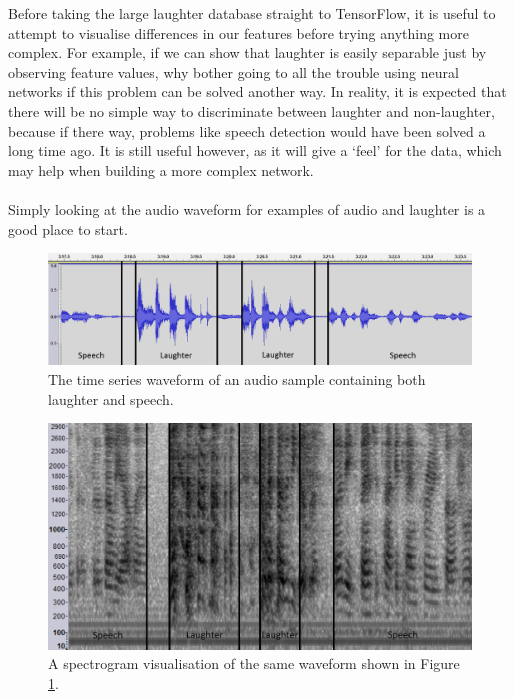 \documentclass[a4paper,11pt,notitlepage]{article}
\begin{document}
Before taking the large laughter database straight to TensorFlow, it is useful to attempt to visualise differences in our features before trying anything more complex. For example, if we can show that laughter is easily separable just by observing feature values, why bother going to all the trouble using neural networks if this problem can be solved another way. In reality, it is expected that there will be no simple way to discriminate between laughter and non-laughter, because if there way, problems like speech detection would have been solved a long time ago. It is still useful however, as it will give a `feel' for the data, which may help when building a more complex network.\\
\\
Simply looking at the audio waveform for examples of audio and laughter is a good place to start.

\begin{figure}[H]
	\centering
	\vspace{0.5cm}
	\includegraphics[scale = 0.4]{figs/time-series2.png}
	\caption{The time series waveform of an audio sample containing both laughter and speech.}
	\label{time-series2}
\end{figure}

\begin{figure}[H]
	\centering
	\vspace{0.5cm}
	\includegraphics[scale = 0.462]{figs/spectrum2.png}
	\caption{A spectrogram visualisation of the same waveform shown in Figure \ref{time-series2}.}
	\label{spectrum2}
\end{figure}
\end{document}
